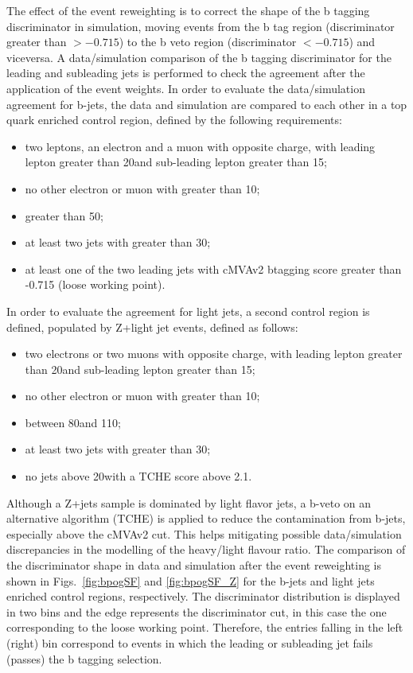 The effect of the event reweighting is to correct the shape of the b tagging discriminator in simulation, moving events from the b tag region (discriminator greater than $> -0.715$) to the b veto region (discriminator $ < -0.715$) and viceversa. A data/simulation comparison of the b tagging discriminator for the leading and subleading jets is performed to check the agreement after the application of the event weights. In order to evaluate the data/simulation agreement for b-jets, the data and simulation are compared to each other in a top quark enriched control region, defined by the following requirements:
\begin{itemize}
\item two leptons, an electron and a muon with opposite charge, with
leading lepton \pt greater than 20\GeV and sub-leading lepton \pt greater than 15\GeV;
\item no other electron or muon with \pt greater than 10\GeV;
\item \mll greater than 50\GeV;
\item at least two jets with \pt greater than 30\GeV;
\item at least one of the two leading jets with cMVAv2 btagging score
greater than -0.715 (loose working point).
\end{itemize}
In order to evaluate the agreement for light jets, a second
control region is defined, populated by Z+light jet events, defined as follows:
\begin{itemize}
\item two electrons or two muons with opposite charge, with
leading lepton \pt greater than 20\GeV and sub-leading lepton \pt greater than 15\GeV;
\item no other electron or muon with \pt greater than 10\GeV;
\item \mll between 80\GeV and 110\GeV;
\item at least two jets with \pt greater than 30\GeV;
\item no jets above 20\GeV with a TCHE score above 2.1. 
\end{itemize}
Although a Z+jets sample is dominated by light flavor jets, a b-veto on an
alternative algorithm (TCHE) is applied to reduce the contamination from b-jets,
especially above the cMVAv2 cut. This helps mitigating possible data/simulation discrepancies in the modelling of the heavy/light flavour ratio.
The comparison of the discriminator shape in data and simulation after the event reweighting is shown in Figs.~\ref{fig:bpogSF} and \ref{fig:bpogSF_Z} for the b-jets and light jets enriched control regions, respectively. The discriminator distribution is displayed in two bins and the edge represents the discriminator cut, in this case the one corresponding to the loose working point. Therefore, the entries falling in the left (right) bin correspond to events in which the leading or subleading jet fails (passes) the b tagging selection.

